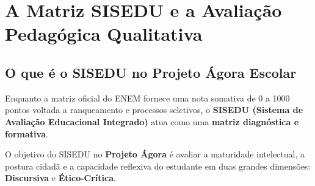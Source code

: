 \documentclass[11pt,a4paper]{article}
\begin{document}
\section{A Matriz SISEDU e a Avaliação Pedagógica Qualitativa}

\subsection{O que é o SISEDU no Projeto Ágora Escolar}
Enquanto a matriz oficial do ENEM fornece uma nota somativa de 0 a 1000 pontos voltada a ranqueamento e processos seletivos, o \textbf{SISEDU (Sistema de Avaliação Educacional Integrado)} atua como uma \textbf{matriz diagnóstica e formativa}.

O objetivo do SISEDU no \textbf{Projeto Ágora} é avaliar a maturidade intelectual, a postura cidadã e a capacidade reflexiva do estudante em duas grandes dimensões: \textbf{Discursiva} e \textbf{Ético-Crítica}.
\end{document}
